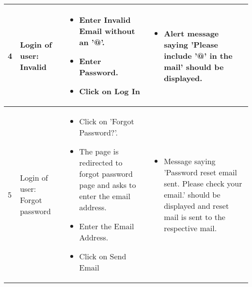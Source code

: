 \documentclass[english,a4paper,12pt]{report}
\begin{document}
\begin{longtable} { | p{2cm} | p{3cm}| p{6cm}| p{6cm} |}
\hline 4 &  Login of user: Invalid &
\vspace{-5mm}
\begin{itemize}
\item Enter Invalid Email without an '@'.
\item Enter Password.
\item Click on Log In
\end{itemize}& 
\vspace{-5mm}
\begin{itemize}
\item Alert message saying 'Please include '@' in the mail' should be displayed. 
\end{itemize}\\ 
\hline 5 &  Login of user: Forgot password & 
\vspace{-5mm}
\begin{itemize}
\item Click on 'Forgot Password?'.
\item The page is redirected to forgot password page and asks to enter the email address.
\item Enter the Email Address.
\item Click on Send Email 
\end{itemize}& 
\vspace{-5mm}
\begin{itemize}
\item Message saying 'Password reset email sent. Please check your email.' should be displayed and reset mail is sent to the respective mail.
\end{itemize}\\ 

\hline
\end{longtable}
 
\end{document}
